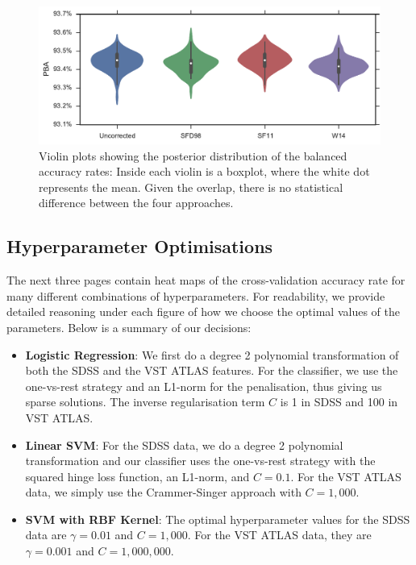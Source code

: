 \begin{figure}[tbp]
	\centering
	\includegraphics[width=\textwidth]{figures/4_expt1/violin_reddening_correction}
	\caption[Accuracy rates with three extinction vectors]{Violin plots
		showing the posterior distribution of the balanced accuracy rates: Inside each
		violin is a boxplot, where the white dot represents the mean. Given the overlap,
        there is no statistical difference between the four approaches.}
	\label{fig:reddeningviolin}
\end{figure}

\subsection{Hyperparameter Optimisations}
\label{sub:hyper}

The next three pages contain heat maps of the cross-validation accuracy rate
for many different combinations of hyperparameters. For readability, we provide detailed
reasoning under each figure of how we choose the optimal values of the parameters.
Below is a summary of our decisions:
\begin{itemize}
	\item \textbf{Logistic Regression}: We first do a degree 2 polynomial transformation of both
	the SDSS and the VST ATLAS features. For the classifier, we use the one-vs-rest
	strategy and an L1-norm for the penalisation, thus giving us sparse solutions. The inverse
	regularisation term $C$ is 1 in SDSS and 100 in VST ATLAS.
    
	\item \textbf{Linear SVM}: For the SDSS data, we do a degree 2 polynomial transformation
	and our classifier uses the one-vs-rest strategy with the squared hinge loss function,
    an L1-norm, and $C=0.1$. For the VST ATLAS data, we simply
    use the Crammer-Singer approach with $C = 1,000$.
	\item \textbf{SVM with RBF Kernel}: The optimal hyperparameter values for the SDSS data are
	$\gamma = 0.01$ and $C = 1,000$. For the VST ATLAS data, they are $\gamma = 0.001$ and
	$C = 1,000,000$.
\end{itemize}

